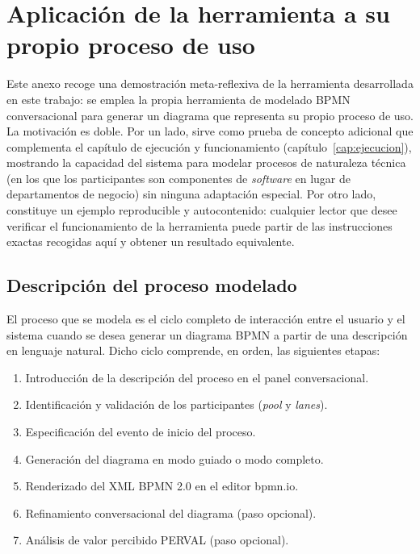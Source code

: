 


\chapter{Aplicación de la herramienta a su propio proceso de uso}
\label{anx:metademo}

Este anexo recoge una demostración meta-reflexiva de la herramienta desarrollada en este trabajo: se emplea la propia herramienta de modelado BPMN conversacional para generar un diagrama que representa su propio proceso de uso. La motivación es doble. Por un lado, sirve como prueba de concepto adicional que complementa el capítulo de ejecución y funcionamiento (capítulo~\ref{cap:ejecucion}), mostrando la capacidad del sistema para modelar procesos de naturaleza técnica (en los que los participantes son componentes de \textit{software} en lugar de departamentos de negocio) sin ninguna adaptación especial. Por otro lado, constituye un ejemplo reproducible y autocontenido: cualquier lector que desee verificar el funcionamiento de la herramienta puede partir de las instrucciones exactas recogidas aquí y obtener un resultado equivalente.

\section{Descripción del proceso modelado}
\label{sec:anx1-proceso}

El proceso que se modela es el ciclo completo de interacción entre el usuario y el sistema cuando se desea generar un diagrama BPMN a partir de una descripción en lenguaje natural. Dicho ciclo comprende, en orden, las siguientes etapas:

\begin{enumerate}
  \item Introducción de la descripción del proceso en el panel conversacional.
  \item Identificación y validación de los participantes (\textit{pool} y \textit{lanes}).
  \item Especificación del evento de inicio del proceso.
  \item Generación del diagrama en modo guiado o modo completo.
  \item Renderizado del XML BPMN 2.0 en el editor bpmn.io.
  \item Refinamiento conversacional del diagrama (paso opcional).
  \item Análisis de valor percibido PERVAL (paso opcional).
\end{enumerate}

